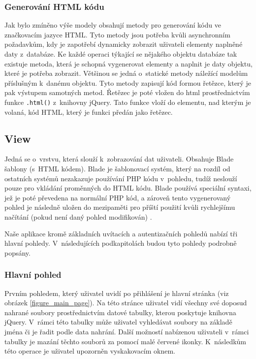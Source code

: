 \subsubsection{Generování HTML kódu}
Jak bylo zmíněno výše modely obsahují metody pro generování kódu ve značkovacím jazyce HTML. Tyto metody jsou potřeba kvůli asynchronním požadavkům, kdy je zapotřebí dynamicky zobrazit uživateli elementy naplněné daty z~databáze. Ke každé operaci týkající se nějakého objektu databáze tak existuje metoda, která je schopná vygenerovat elementy a naplnit je daty objektu, které je potřeba zobrazit. Většinou se jedná o~statické metody náležící modelům příslušným k~danému objektu. Tyto metody zapisují kód formou řetězce, který je pak výstupem samotných metod. Řetězec je poté vložen do html prostřednictvím funkce \verb|.html()| z~knihovny jQuery. Tato funkce vloží do elementu, nad kterým je volaná, kód HTML, který je funkci předán jako řetězec.

\subsection{View}
Jedná se o~vrstvu, která slouží k~zobrazování dat uživateli. Obsahuje Blade šablony (s~HTML kódem). Blade je šablonovací systém, který na rozdíl od ostatních systémů nezakazuje používání PHP kódu v~pohledu, tudíž neslouží pouze pro vkládání proměnných do HTML kódu. Blade používá speciální syntaxi, jež je poté převedena na normální PHP kód, a zároveň tento vygenerovaný pohled je následně uložen do mezipaměti pro příští použití kvůli rychlejšímu načítání (pokud není daný pohled modifikován) \cite{Laravel2}.

Naše aplikace kromě základních uvítacích a autentizačních pohledů nabízí tři hlavní pohledy. V~následujících podkapitolách budou tyto pohledy podrobně popsány.

\subsubsection{Hlavní pohled}
Prvním pohledem, který uživatel uvidí po přihlášení je hlavní stránka (viz obrázek \ref{figure_main_page}). Na této stránce uživatel vidí všechny své doposud nahrané soubory prostřednictvím datové tabulky, kterou poskytuje knihovna jQuery. V~rámci této tabulky může uživatel vyhledávat soubory na základě jména či je řadit podle data nahrání. Další možností nabízenou uživateli v~rámci tabulky je mazání těchto souborů za pomocí malé červené ikonky. K~následkům této operace je uživatel upozorněn vyskakovacím oknem.

